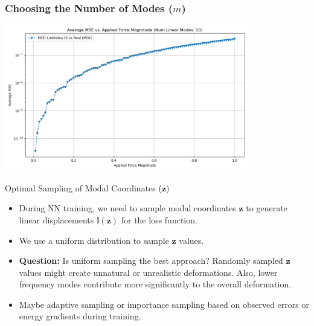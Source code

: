 \documentclass{beamer}
\begin{document}
\begin{frame}
    \frametitle{Choosing the Number of Modes (\(m\))}
    \begin{centering}
        \includegraphics[width=0.8\textwidth]{Images/mse_10_modes.png}
    \end{centering}

\end{frame}

\begin{frame}{Optimal Sampling of Modal Coordinates (\(\bm{z}\))}
    \begin{itemize}
        \item During NN training, we need to sample modal coordinates \(\bm{z}\) to generate linear displacements \(\bm{l}(\bm{z})\) for the loss function.
        \item We use a uniform distribution to sample \(\bm{z}\) values.

        \item \textbf{Question:} Is uniform sampling the best approach? Randomly sampled \(\bm{z}\) values might create unnatural or unrealistic deformations. Also, lower frequency modes contribute more significantly to the overall deformation.
        \item Maybe adaptive sampling or importance sampling based on observed errors or energy gradients during training.
    \end{itemize}
\end{frame}
\end{document}
